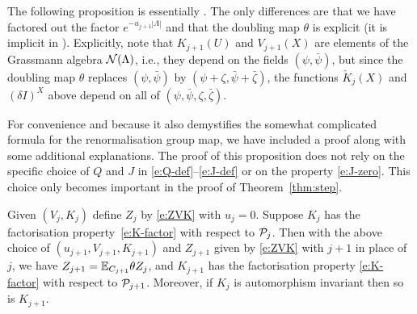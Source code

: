\documentclass[11pt]{amsart}
\numberwithin{equation}{section}
\numberwithin{theorem}{section}
\newcommand{\1}{{\bf 1}}
\begin{document}
The following proposition is essentially
\cite[Proposition~5.1]{MR2523458}.  The only differences are that 
we have factored out the factor $e^{-u_{j+1}|\Lambda|}$ and that 
the doubling map $\theta$ is explicit (it is implicit in \cite{MR2523458}).
Explicitly, note that $K_{j+1}(U)$ and $V_{j+1}(X)$ are elements of
the Grassmann algebra $\mathcal N(\Lambda)$, i.e., they depend on the fields $(\psi,\bar\psi)$,
but since the doubling map $\theta$ replaces $(\psi,\bar\psi)$ by $(\psi+\zeta,\bar\psi+\bar\zeta)$,
the functions $\check{K}_j(X)$ and $(\delta I)^X$ above depend on all of $(\psi,\bar\psi,\zeta,\bar\zeta)$.

For convenience and because it also demystifies the somewhat
complicated formula for the renormalisation group map, we have included a proof
along with some additional explanations.
The proof of this proposition does not rely on the specific choice of $Q$ and $J$
in \eqref{e:Q-def}--\eqref{e:J-def} or on the property \eqref{e:J-zero}.
This choice only becomes important in the proof of Theorem~\ref{thm:step}.



\begin{proposition} \label{prop:ZVK} Given $(V_j,K_j)$ define $Z_j$ by
  \eqref{e:ZVK} with $u_{j}=0$. Suppose $K_{j}$ has the factorisation
  property~\eqref{e:K-factor} with respect to $\mathcal P_{j}$. Then with the
  above choice of $(u_{j+1},V_{j+1},K_{j+1})$ and $Z_{j+1}$ given by
  \eqref{e:ZVK} with $j+1$ in place of $j$, we have
  $Z_{j+1}=\mathbb{E}_{C_{j+1}}\theta Z_j$, and $K_{j+1}$ has the
  factorisation property \eqref{e:K-factor} with respect to
  $\mathcal P_{j+1}$.  Moreover, if $K_j$ is automorphism invariant then so
  is $K_{j+1}$.
\end{proposition}
\end{document}
